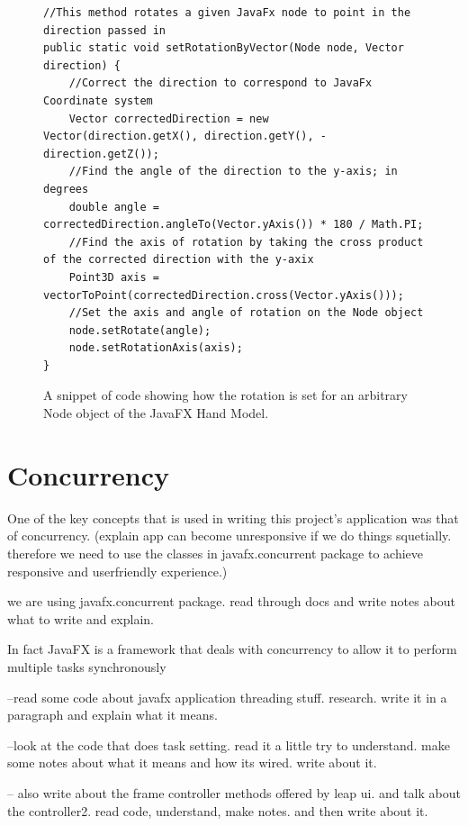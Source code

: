 \begin{figure}[th]
\centering
\begin{lstlisting}
//This method rotates a given JavaFx node to point in the direction passed in
public static void setRotationByVector(Node node, Vector direction) {
	//Correct the direction to correspond to JavaFx Coordinate system
	Vector correctedDirection = new Vector(direction.getX(), direction.getY(), -direction.getZ());
	//Find the angle of the direction to the y-axis; in degrees
	double angle = correctedDirection.angleTo(Vector.yAxis()) * 180 / Math.PI;
	//Find the axis of rotation by taking the cross product of the corrected direction with the y-axix
	Point3D axis = vectorToPoint(correctedDirection.cross(Vector.yAxis()));
	//Set the axis and angle of rotation on the Node object
	node.setRotate(angle);
	node.setRotationAxis(axis);
}
\end{lstlisting}
\caption[setRotationByVector Method]{A snippet of code showing how the rotation is set for an arbitrary Node object of the JavaFX Hand Model.}
\label{fig:setRotationByVectorCode}
\end{figure}




\section{Concurrency}
One of the key concepts that is used in writing this project's application was that of concurrency. (explain app can become unresponsive if we do things squetially. therefore we need to use the classes in javafx.concurrent package to achieve responsive and userfriendly experience.)



we are using javafx.concurrent package. read through docs and write notes about what to write and explain. 



In fact JavaFX is a framework that deals with concurrency to allow it to perform multiple tasks synchronously 





--read some code about javafx application threading stuff. research. 
write it in a paragraph and explain what it means. 

--look at the code that does task setting. read it a little try to understand. make some notes about what it means and how its wired. 
write about it. 

-- also write about the frame controller methods offered by leap ui. and talk about the controller2. read code, understand, make notes. and then write about it. 